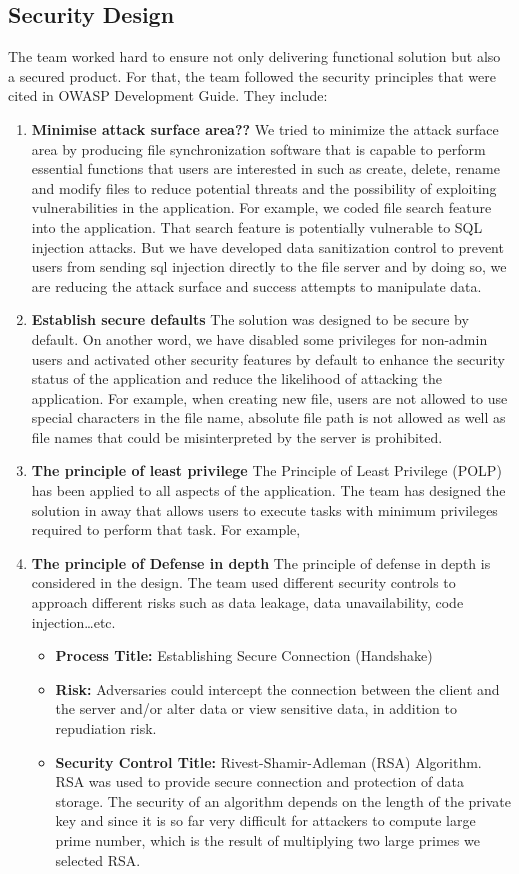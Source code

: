 \documentclass{article}
\begin{document}
\subsection{Security Design}

The team worked hard to ensure not only delivering functional solution but also a secured product. For that, the team followed the security principles that were cited in OWASP Development Guide. They include:

\begin{enumerate}
\item \textbf{Minimise attack surface area??}
We tried to minimize the attack surface area by producing file synchronization software that is capable to perform essential functions that users are interested in  such as create, delete, rename and modify files to reduce potential threats and the possibility of exploiting vulnerabilities in the application.
For example, we coded file search feature into the application. That search feature is potentially vulnerable to SQL injection attacks. But we have developed data sanitization control to prevent users from sending sql injection directly to the file server and by doing so, we are reducing the attack surface and success attempts to manipulate data.
\item \textbf{Establish secure defaults}
The solution was designed to be secure by default. On another word, we have disabled some privileges for non-admin users and activated other security features by default to enhance the security status of the application and reduce the likelihood of attacking the application. For example, when creating new file, users are not allowed to use special characters in the file name, absolute file path is not allowed as well as file names that could be misinterpreted by the server is prohibited.
\item \textbf{The principle of least privilege}
The Principle of Least Privilege (POLP) has been applied to all aspects of the application. The team has designed the solution in away that allows users to execute tasks with minimum privileges required to perform that task.
For example,
\item \textbf{The principle of Defense in depth}
The principle of defense in depth is considered in the design. The team used different security controls to approach different risks such as data leakage, data unavailability, code injection…etc.
\begin{itemize}
\item \textbf{Process Title:} Establishing Secure Connection (Handshake)
\item \textbf{Risk:} Adversaries could intercept the connection between the client and the server and/or alter data or view sensitive data, in addition to repudiation risk.
\item \textbf{Security Control Title:} Rivest-Shamir-Adleman (RSA) Algorithm. RSA was used to provide secure connection and protection of data storage. The security of an algorithm depends on the length of the private key and since it is so far very difficult for attackers to compute large prime number, which is the result of multiplying two large primes we selected RSA.


\end{itemize}
\end{enumerate}
\end{document}
